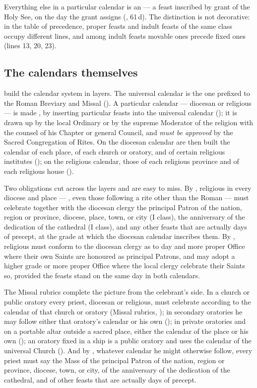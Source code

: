 Everything else in a particular calendar is an  — a feast inscribed by grant of
the Holy See, on the day the grant assigns (, 61\,d). The distinction is not decorative:
in the table of precedence, proper feasts and indult feasts of the same class occupy different
lines, and among indult feasts movable ones precede fixed ones (lines 13, 20, 23).

\subsection{The calendars themselves}

 build the calendar system in layers. The universal calendar is the one prefixed to
the Roman Breviary and Missal (). A particular calendar — diocesan or religious — is made
, by inserting particular feasts into
the universal calendar (); it is drawn up by the local Ordinary or by the supreme
Moderator of the religion with the counsel of his Chapter or general Council, and \emph{must be
approved} by the Sacred Congregation of Rites. On the diocesan calendar are then built the
calendar of each place, of each church or oratory, and of certain religious institutes
(); on the religious calendar, those of each religious province and of each religious
house ().

Two obligations cut across the layers and are easy to miss. By , religious in every
diocese and place — , even those following
a rite other than the Roman — must celebrate together with the diocesan clergy the principal
Patron of the nation, region or province, diocese, place, town, or city (I class), the
anniversary of the dedication of the cathedral (I class), and any other feasts that are actually
days of precept, at the grade at which the diocesan calendar inscribes them. By ,
religious must conform to the diocesan clergy as to day and more proper Office where their own
Saints are honoured as principal Patrons, and may adopt a higher grade or more proper Office
where the local clergy celebrate their Saints so, provided the feasts stand on the same day in
both calendars.

The Missal rubrics complete the picture from the celebrant's side. In a church or public
oratory every priest, diocesan or religious, must celebrate according to the calendar of that
church or oratory (Missal rubrics, ); in secondary oratories he may follow either that
oratory's calendar or his own (); in private oratories and on a portable altar outside
a sacred place, either the calendar of the place or his own (); an oratory fixed in a
ship is a public oratory and uses the calendar of the universal Church (). And by
, whatever calendar he might otherwise follow, every priest must say the Mass of the
principal Patron of the nation, region or province, diocese, town, or city, of the anniversary
of the dedication of the cathedral, and of other feasts that are actually days of precept.
